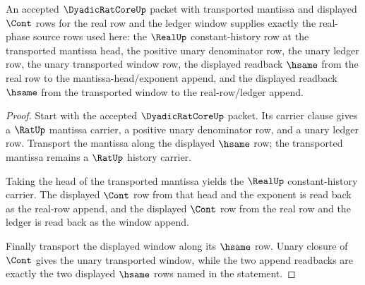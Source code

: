 \begin{theorem}
\label{thm:dyadicratcore-real-phase-source-coverage}
An accepted $\DyadicRatCoreUp$ packet with transported mantissa and displayed
$\Cont$ rows for the real row and the ledger window supplies exactly the
real-phase source rows used here: the $\RealUp$ constant-history row at the
transported mantissa head, the positive unary denominator row, the unary ledger
row, the unary transported window row, the displayed readback
$\hsame$ from the real row to the mantissa-head/exponent append, and the
displayed readback $\hsame$ from the transported window to the real-row/ledger
append.
\end{theorem}
\begin{proof}
Start with the accepted $\DyadicRatCoreUp$ packet. Its carrier clause gives a
$\RatUp$ mantissa carrier, a positive unary denominator row, and a unary ledger
row. Transport the mantissa along the displayed $\hsame$ row; the transported
mantissa remains a $\RatUp$ history carrier.

Taking the head of the transported mantissa yields the
$\RealUp$ constant-history carrier. The displayed $\Cont$ row from that head
and the exponent is read back as the real-row append, and the displayed
$\Cont$ row from the real row and the ledger is read back as the window append.

Finally transport the displayed window along its $\hsame$ row. Unary closure of
$\Cont$ gives the unary transported window, while the two append readbacks are
exactly the two displayed $\hsame$ rows named in the statement.
\end{proof}

